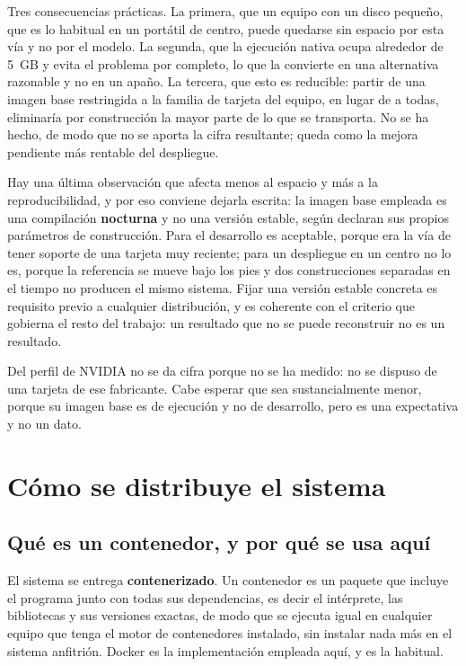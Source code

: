 Tres consecuencias prácticas. La primera, que un equipo con un disco pequeño, que es lo
habitual en un portátil de centro, puede quedarse sin espacio por esta vía y no por el
modelo. La segunda, que la ejecución nativa ocupa alrededor de 5~GB y evita el problema por
completo, lo que la convierte en una alternativa razonable y no en un apaño. La tercera, que
esto es reducible: partir de una imagen base restringida a la familia de tarjeta del equipo,
en lugar de a todas, eliminaría por construcción la mayor parte de lo que se transporta. No
se ha hecho, de modo que no se aporta la cifra resultante; queda como la mejora pendiente
más rentable del despliegue.

Hay una última observación que afecta menos al espacio y más a la reproducibilidad, y por eso
conviene dejarla escrita: la imagen base empleada es una compilación \textbf{nocturna} y no
una versión estable, según declaran sus propios parámetros de construcción. Para el
desarrollo es aceptable, porque era la vía de tener soporte de una tarjeta muy reciente; para
un despliegue en un centro no lo es, porque la referencia se mueve bajo los pies y dos
construcciones separadas en el tiempo no producen el mismo sistema. Fijar una versión estable
concreta es requisito previo a cualquier distribución, y es coherente con el criterio que
gobierna el resto del trabajo: un resultado que no se puede reconstruir no es un resultado.

Del perfil de NVIDIA no se da cifra porque no se ha medido: no se dispuso de una tarjeta de
ese fabricante. Cabe esperar que sea sustancialmente menor, porque su imagen base es de
ejecución y no de desarrollo, pero es una expectativa y no un dato.

\section{Cómo se distribuye el sistema}
\label{sec:contenedores}

\subsection*{Qué es un contenedor, y por qué se usa aquí}

El sistema se entrega \textbf{contenerizado}. Un contenedor es un paquete que incluye el
programa junto con todas sus dependencias, es decir el intérprete, las bibliotecas y sus
versiones exactas, de modo que se ejecuta igual en cualquier equipo que tenga el motor de
contenedores instalado, sin instalar nada más en el sistema anfitrión. Docker es la implementación
empleada aquí, y es la habitual.


